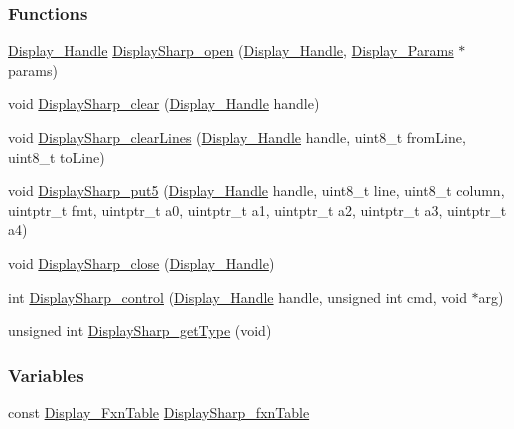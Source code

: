 \subsubsection*{Functions}
\begin{DoxyCompactItemize}
\item 
\hyperlink{_display_8h_a045a26811755aabf1886d982c49e54ab}{Display\+\_\+\+Handle} \hyperlink{_display_sharp_8h_a97a0ae6d2811237e4b0cddac24e04880}{Display\+Sharp\+\_\+open} (\hyperlink{_display_8h_a045a26811755aabf1886d982c49e54ab}{Display\+\_\+\+Handle}, \hyperlink{struct_display___params}{Display\+\_\+\+Params} $\ast$params)
\item 
void \hyperlink{_display_sharp_8h_adbb2a9fd5349f5ae4cb881a57da90c52}{Display\+Sharp\+\_\+clear} (\hyperlink{_display_8h_a045a26811755aabf1886d982c49e54ab}{Display\+\_\+\+Handle} handle)
\item 
void \hyperlink{_display_sharp_8h_a6ca5f8e56b7d7e14d1c8facc1364edb1}{Display\+Sharp\+\_\+clear\+Lines} (\hyperlink{_display_8h_a045a26811755aabf1886d982c49e54ab}{Display\+\_\+\+Handle} handle, uint8\+\_\+t from\+Line, uint8\+\_\+t to\+Line)
\item 
void \hyperlink{_display_sharp_8h_a16d462b9d57110237f30a201e9ff4676}{Display\+Sharp\+\_\+put5} (\hyperlink{_display_8h_a045a26811755aabf1886d982c49e54ab}{Display\+\_\+\+Handle} handle, uint8\+\_\+t line, uint8\+\_\+t column, uintptr\+\_\+t fmt, uintptr\+\_\+t a0, uintptr\+\_\+t a1, uintptr\+\_\+t a2, uintptr\+\_\+t a3, uintptr\+\_\+t a4)
\item 
void \hyperlink{_display_sharp_8h_a681c21997c6cc14058bba72bc0586ef4}{Display\+Sharp\+\_\+close} (\hyperlink{_display_8h_a045a26811755aabf1886d982c49e54ab}{Display\+\_\+\+Handle})
\item 
int \hyperlink{_display_sharp_8h_a4ab2badbd3b5e9ce136a2d5d6766674a}{Display\+Sharp\+\_\+control} (\hyperlink{_display_8h_a045a26811755aabf1886d982c49e54ab}{Display\+\_\+\+Handle} handle, unsigned int cmd, void $\ast$arg)
\item 
unsigned int \hyperlink{_display_sharp_8h_a84b926652d7f687008dc7cd081325c61}{Display\+Sharp\+\_\+get\+Type} (void)
\end{DoxyCompactItemize}
\subsubsection*{Variables}
\begin{DoxyCompactItemize}
\item 
const \hyperlink{struct_display___fxn_table}{Display\+\_\+\+Fxn\+Table} \hyperlink{_display_sharp_8h_a0177a7fbf362ab53a6fe3d520dd62017}{Display\+Sharp\+\_\+fxn\+Table}
\end{DoxyCompactItemize}


